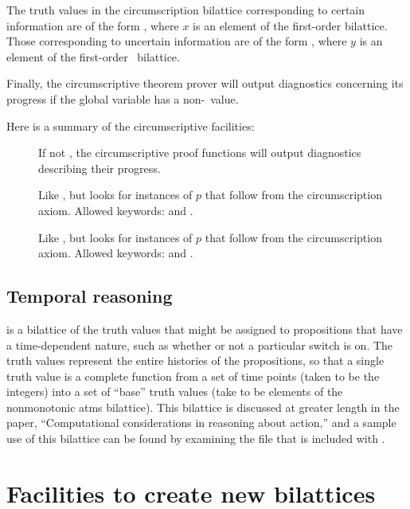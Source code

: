 The truth values in the circumscription bilattice corresponding to
certain information are of the form , where $x$ is an
element of the first-order bilattice.  Those corresponding to uncertain
information are of the form , where $y$ is an element
of the first-order \atms\ bilattice.

Finally, the circumscriptive theorem prover will output diagnostics
concerning its progress if the global variable 
has a non-\NIL\ value.

Here is a summary of the circumscriptive facilities:
 \begin{description} 
 \item [] If not \NIL, the circumscriptive proof
functions will output diagnostics describing their progress.
 \item [] Like , but looks for instances of
$p$ that follow from the circumscription axiom.  Allowed keywords:
 and .
 \item [] Like , but looks for instances of
$p$ that follow from the circumscription axiom.  Allowed keywords:
 and .
 \end{description}

\subsection{Temporal reasoning}

 is a bilattice of the truth values that might
be assigned to propositions that have a time-dependent nature, such as
whether or not a particular switch is on.  The truth values represent
the entire histories of the propositions, so that a single truth value
is a complete function from a set of time points (taken to be the
integers) into a set of ``base'' truth values (take to be elements of
the nonmonotonic {\sc atms} bilattice). This bilattice is discussed at
greater length in the paper, ``Computational considerations in
reasoning about action,'' and a sample use of this bilattice can be
found by examining the file  that is included with
\mvl.

\section{Facilities to create new bilattices}
\label{s.construct}

